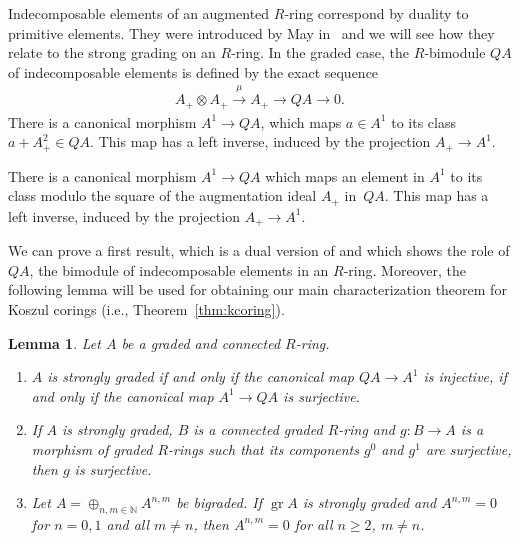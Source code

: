 \documentclass[pdftex]{sigma}
\newcommand\ot{\otimes}
\newcommand\rar{\rightarrow}
\newcommand\bb{\mathbb}
\renewcommand{\^}[1]{\mbox{$^{\left( #1 \right)}$}}
\renewcommand{\_}[1]{\mbox{$_{\left( #1 \right)}$}}
\newcommand\xrar{\xrightarrow}
\numberwithin{equation}{section}
\newtheorem{Lemma}[Theorem]{Lemma}
\begin{document}
Indecomposable elements of an augmented $R$-ring correspond by duality to primitive elements. They were introduced by May in~\cite{may} and we will see how they relate to the strong grading on an $R$-ring. In the graded case, the $R$-bimodule $QA$ of indecomposable elements is def\/ined by the exact sequence
\begin{gather*} A_+ \ot A_+ \xrar{\mu} A_+ \to QA \to 0.\end{gather*}
There is a canonical morphism $A^1 \to QA$, which maps $a \in A^1$ to its class $a + A_+^2 \in QA$. This map has a left inverse, induced by the projection $A_+ \to A^1$.

There is a canonical morphism $A^1 \to QA$ which maps an element in $A^1$ to its class modulo the square of the augmentation ideal $A_+$ in~$QA$. This map has a left inverse, induced by the projection $A_+ \to A^1$.

We can prove a f\/irst result, which is a dual version of \cite[Lemma~1.4]{mst} and which shows the role of $QA$, the bimodule of indecomposable elements in an $R$-ring. Moreover, the following lemma will be used for obtaining our main characterization theorem for Koszul corings (i.e., Theorem~\ref{thm:kcoring}).

\begin{Lemma} \label{lema:ring}
Let $A$ be a graded and connected $R$-ring.
\begin{enumerate}\itemsep=0pt
\item[$1.$] $A$ is strongly graded if and only if the canonical map $QA\to A^1$ is injective, if and only if the canonical map $A^1\to QA$ is surjective.

\item[$2.$] If $A$ is strongly graded, $B$ is a connected graded $R$-ring and $g\colon B \rar A$ is a morphism of graded $R$-rings such that its components $g^0$ and $g^1$ are surjective, then $g$ is surjective.

\item[$3.$] Let $A=\oplus_{n,m\in\bb{N}}A^{n,m}$ be bigraded. If $\operatorname{gr}A$ is strongly graded and $A^{n,m}=0$ for $n=0,1$ and all $m \neq n$, then $A^{n,m}=0$ for all $n\geq 2$, $m\neq n$.
\end{enumerate}
\end{Lemma}
\end{document}
